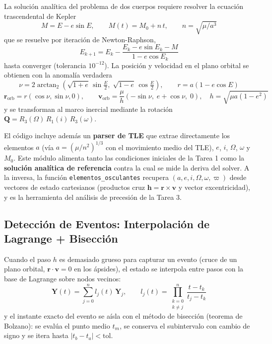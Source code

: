 \documentclass[11pt, a4paper]{article}
\begin{document}
La solución analítica del problema de dos cuerpos requiere resolver la ecuación trascendental de Kepler
\begin{equation}
	M = E - e\sin E, \qquad M(t) = M_0 + n\,t, \qquad n = \sqrt{\mu/a^3}
	\label{eq:kepler_eq}
\end{equation}
que se resuelve por iteración de Newton-Raphson,
\begin{equation}
	E_{k+1} = E_k - \frac{E_k - e\sin E_k - M}{1 - e\cos E_k}
\end{equation}
hasta converger (tolerancia $10^{-12}$). La posición y velocidad en el plano orbital se obtienen con la anomalía verdadera
\begin{equation}
	\nu = 2\arctan_2\!\left(\sqrt{1+e}\,\sin\tfrac{E}{2},\; \sqrt{1-e}\,\cos\tfrac{E}{2}\right), \qquad
	r = a(1 - e\cos E)
\end{equation}
\begin{equation}
	\mathbf{r}_{\text{orb}} = r(\cos\nu, \sin\nu, 0), \qquad
	\mathbf{v}_{\text{orb}} = \frac{\mu}{h}\left(-\sin\nu,\; e + \cos\nu,\; 0\right), \quad h = \sqrt{\mu a (1-e^2)}
\end{equation}
y se transforman al marco inercial mediante la rotación $\mathbf{Q} = R_3(\Omega)\,R_1(i)\,R_3(\omega)$.

El código incluye además un \textbf{parser de TLE} que extrae directamente los elementos $a$ (vía $a = (\mu/n^2)^{1/3}$ con el movimiento medio del TLE), $e$, $i$, $\Omega$, $\omega$ y $M_0$. Este módulo alimenta tanto las condiciones iniciales de la Tarea 1 como la \textbf{solución analítica de referencia} contra la cual se mide la deriva del solver. A la inversa, la función \texttt{elementos\_osculantes} recupera $(a, e, i, \Omega, \omega, \varpi)$ desde vectores de estado cartesianos (productos cruz $\mathbf{h} = \mathbf{r}\times\mathbf{v}$ y vector excentricidad), y es la herramienta del análisis de precesión de la Tarea 3.

\subsection{Detección de Eventos: Interpolación de Lagrange + Bisección}

Cuando el paso $h$ es demasiado grueso para capturar un evento (cruce de un plano orbital, $\mathbf{r}\cdot\mathbf{v} = 0$ en los ápsides), el estado se interpola entre pasos con la base de Lagrange sobre nodos vecinos:
\begin{equation}
	\mathbf{Y}(t) = \sum_{j=0}^{n} l_j(t)\, \mathbf{Y}_j, \qquad l_j(t) = \prod_{\substack{k=0 \\ k \neq j}}^{n} \frac{t - t_k}{t_j - t_k}
\end{equation}
y el instante exacto del evento se aísla con el método de bisección (teorema de Bolzano): se evalúa el punto medio $t_m$, se conserva el subintervalo con cambio de signo y se itera hasta $|t_b - t_a| < \text{tol}$.
\end{document}
